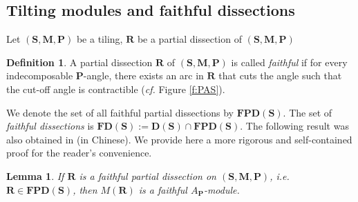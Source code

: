 \documentclass[a4paper,10pt]{amsart}
\theoremstyle{plain}          %
\newtheorem{lemma}[theorem]{Lemma}
\theoremstyle{definition}
\newtheorem{definition}[theorem]{Definition}
\def\SS{\mathbf{S}}
\def\RR{\mathbf{R}}
\def\MM{\mathbf{M}}
\def\PP{\mathbf{P}}
\def\MM{\mathbf{M}}
\newcommand{\FD}{\mathbf{FD}}
\newcommand{\FPD}{\mathbf{FPD}}
\newcommand{\D}{\mathbf{D}}
\newcommand{\ie}{{\em i.e.}\ }
\begin{document}
\subsection{Tilting modules and faithful dissections} \label{ss:tilting modules and faithful dissection}
Let $(\SS,\MM,\PP)$ be a tiling, $\mathbf{R}$ be a partial dissection of $(\SS,\MM,\PP)$

\begin{definition}
A partial dissection $\mathbf{R}$  of $(\SS,\MM,\PP)$ is called  {\it faithful }  if  for every indecomposable  $\PP$-angle, there exists an arc in $\RR$ that cuts the angle such that the cut-off angle is contractible ({\em cf.} Figure \ref{f:PAS}). 
\end{definition}




We denote the set of all  faithful partial dissections by $\FPD(\SS)$. The set of \emph{faithful dissections} is $\FD(\SS) := \D(\SS) \cap \FPD(\SS)$.  
 The following result was also obtained in \cite{Nie} (in Chinese). We provide here a more rigorous and self-contained proof for the reader's convenience.
\begin{lemma}\label{l:PFD is faithful}
    If $\mathbf{R}$ is a faithful partial dissection on $(\SS,\MM,\PP)$, \ie $\mathbf{R}\in\FPD(\SS)$, then $M(\mathbf{R})$ is a faithful $A_{\PP}$-module. 
\end{lemma}
\end{document}
